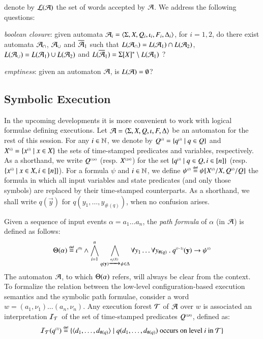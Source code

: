\documentclass{llncs}
\begin{document}
denote by ${\mathcal L}({\mathcal{A}})$ the set of words accepted by $\mathcal{A}$. We address
the following questions: \begin{compactenum}
\item \emph{boolean closure}: given automata $\mathcal{A}_i =
  \langle \Sigma,X,Q_i,\iota_i,F_i,\Delta_i \rangle$, for $i=1,2$, do there
  exist automata $\mathcal{A}_\cap$, $\mathcal{A}_\cup$ and $\overline{\mathcal{A}}_1$ such that
  $L(\mathcal{A}_\cap) = L(\mathcal{A}_1) \cap L(\mathcal{A}_2)$, $L(\mathcal{A}_\cup) = L(\mathcal{A}_1) \cup
  L(\mathcal{A}_2)$ and $L(\overline{\mathcal{A}}_1) = \Sigma[X]^* \setminus L(\mathcal{A}_1)$ ?
%
\item \emph{emptiness}: given an automaton $\mathcal{A}$, is $L(\mathcal{A}) =
  \emptyset$?
\end{compactenum}

\subsection{Symbolic Execution}

In the upcoming developments it is more convenient to work with
logical formulae defining executions. Let $\mathcal{A} =
\langle \Sigma,X,Q,\iota,F,\Delta \rangle$ be an automaton for the rest of
this session. For any $i \in {\bf \mathbb{N}}$, we denote by ${Q}^{\scriptscriptstyle{({i})}} =
\{ {q}^{\scriptscriptstyle{({i})}} \mid q \in Q \}$ and ${X}^{\scriptscriptstyle{({i})}} = \{ {x}^{\scriptscriptstyle{({i})}}
  \mid x \in X \}$ the sets of time-stamped predicates and variables,
respectively. As a shorthand, we write ${Q}^{\scriptscriptstyle{({\leq n})}}$ (resp.
${X}^{\scriptscriptstyle{({\leq n})}}$) for the set $\{ {q}^{\scriptscriptstyle{({i})}} \mid q \in Q, i
  \in [n] \}$ (resp. $\{ {x}^{\scriptscriptstyle{({i})}} \mid x \in X, i \in [n] \}$). For
a formula $\psi$ and $i \in {\bf \mathbb{N}}$, we define ${\psi}^{\scriptscriptstyle{({i})}} \stackrel{\scriptscriptstyle{\mathsf{def}}}{=}
\psi[{X}^{\scriptscriptstyle{({i})}}/X,{Q}^{\scriptscriptstyle{({i})}}/Q]$ the formula in which all input
variables and state predicates (and only those symbols) are replaced
by their time-stamped counterparts. As a shorthand, we shall write
$q(\vec{y})$ for $q(y_1,\ldots,y_{\#(q)})$, when no confusion arises.

Given a sequence of input events $\alpha = a_1 \ldots a_n$, the
\emph{path formula} of $\alpha$ (in $\mathcal{A}$) is defined as follows:
\begin{equation}\label{eq:pathform}
\Theta({\alpha}) \stackrel{\scriptscriptstyle{\mathsf{def}}}{=} {\iota}^{\scriptscriptstyle{({0})}} \wedge 
\bigwedge_{i=1}^n \bigwedge_{q(\mathbf y) \xrightarrow{{\scriptscriptstyle a_i(X)}}_{{\scriptstyle }}
  \psi \in \Delta} \forall y_1 \ldots \forall y_{\#(q)} ~.~
{q}^{\scriptscriptstyle{({i-1})}}(\mathbf y) \rightarrow {\psi}^{\scriptscriptstyle{({i})}}
\end{equation}
The automaton $\mathcal{A}$, to which $\Theta({\alpha})$ refers, will always
be clear from the context. To formalize the relation between the
low-level configuration-based execution semantics and the symbolic
path formulae, consider a word $w=(a_1,\nu_1) \ldots (a_n,\nu_n)$. Any
execution forest $\mathcal{T}$ of $\mathcal{A}$ over $w$ is associated an interpretation
$\mathcal{I}_{\mathcal{T}}$ of the set of time-stamped predicates ${Q}^{\scriptscriptstyle{({\leq n})}}$,
defined as:
\[\mathcal{I}_{\mathcal{T}}({q}^{\scriptscriptstyle{({i})}}) \stackrel{\scriptscriptstyle{\mathsf{def}}}{=} \{ \langle d_1,\ldots,d_{\#(q)} \rangle \mid
  q(d_1,\ldots,d_{\#(q)}) \text{ occurs on level $i$ in $\mathcal{T}$} \}\]
\end{document}
